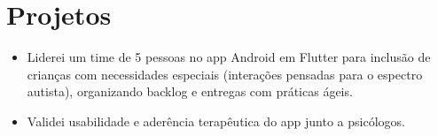 \section{Projetos}

\begin{itemize}
	\item Liderei um time de 5 pessoas no app Android em Flutter para inclusão de crianças com necessidades especiais (interações pensadas para o espectro autista), organizando backlog e entregas com práticas ágeis.
	\item Validei usabilidade e aderência terapêutica do app junto a psicólogos.
\end{itemize}
